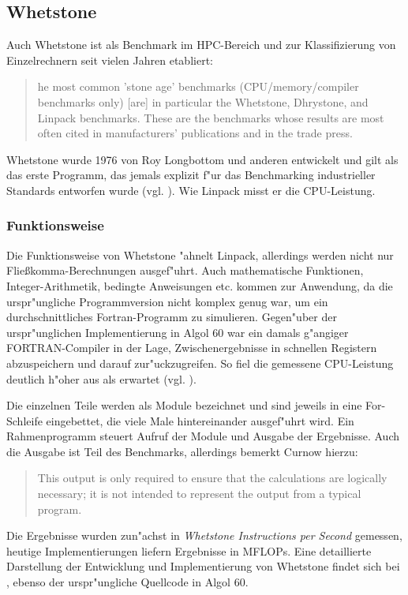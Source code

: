 \subsection{Whetstone}\label{Whetstone}

Auch Whetstone ist als Benchmark im HPC-Bereich und zur Klassifizierung von Einzelrechnern seit vielen Jahren etabliert:
\begin{quote}
\onehalfspacing
[T]he most common 'stone age' benchmarks (CPU/memory/compiler benchmarks only) [are] in particular the Whetstone, Dhrystone, and Linpack benchmarks. These are the benchmarks whose results are most often cited in manufacturers' publications and in the trade press. \cite{wei90}
\end{quote}
Whetstone wurde 1976 von Roy Longbottom und anderen entwickelt und gilt als das erste Programm, das jemals explizit f"ur das Benchmarking industrieller Standards entworfen wurde (vgl. \cite{wei90}). Wie Linpack misst er die CPU-Leistung. 

\subsubsection{Funktionsweise}\label{Funktion-Whetstone}

Die Funktionsweise von Whetstone "ahnelt Linpack, allerdings werden nicht nur Flie\ss komma-Berechnungen ausgef"uhrt. Auch mathematische Funktionen, Integer-Arithmetik, bedingte Anweisungen etc. kommen zur Anwendung, da die urspr"ungliche Programmversion nicht komplex genug war, um ein durchschnittliches Fortran-Programm zu simulieren. Gegen"uber der urspr"unglichen Implementierung in Algol 60 war ein damals g"angiger FOR\-TRAN-Compiler in der Lage, Zwischenergebnisse in schnellen Registern abzuspeichern und darauf zur"uckzugreifen. So fiel die gemessene CPU-Leistung deutlich h"oher aus als erwartet (vgl. \cite{cur76}). 

Die einzelnen Teile werden als Module bezeichnet und sind jeweils in eine For-Schleife eingebettet, die viele Male  hintereinander ausgef"uhrt wird. Ein Rahmenprogramm steuert Aufruf der Module und Ausgabe der Ergebnisse. Auch die Ausgabe ist Teil des Benchmarks, allerdings bemerkt Curnow hierzu: 
\begin{quote}
\onehalfspacing
This output is only required to ensure that the calculations are logically necessary; it is not intended to represent the output from a typical program. \cite{cur76}
\end{quote}
Die Ergebnisse wurden zun"achst in \textit{Whetstone Instructions per Second} gemessen, heutige Implementierungen liefern Ergebnisse in MFLOPs. Eine detaillierte Darstellung der Entwicklung und Implementierung von Whetstone findet sich bei \cite{cur76}, ebenso der urspr"ungliche Quellcode in Algol 60. 

